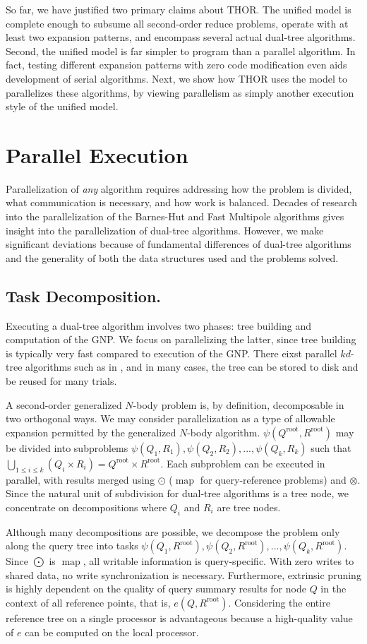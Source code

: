 \documentclass[twoside,leqno,twocolumn]{article}
\newcommand{\Union}{\bigcup}
\DeclareMathOperator*{\map}{map}
\newcommand{\gnp}{\psi}
\newcommand{\mysub}[1]{\subsection{#1.}}
\newcommand{\kdroot}[1]{#1^{\text{root}}}
\newcommand{\lettermu}{e}
\newcommand{\inmu}{e}
\begin{document}
So far, we have justified two primary claims about THOR.
The unified model is complete enough to subsume all second-order reduce problems, operate with at least two expansion patterns, and encompass several actual dual-tree algorithms.
Second, the unified model is far simpler to program than a parallel algorithm.
In fact, testing different expansion patterns with zero code modification even aids development of serial algorithms.
Next, we show how THOR uses the model to parallelizes these algorithms, by viewing parallelism as simply another execution style of the unified model.

\section{Parallel Execution}

Parallelization of {\em any} algorithm requires addressing how the problem is divided, what communication is necessary, and how work is balanced.
Decades of research into the parallelization of the Barnes-Hut and Fast Multipole algorithms gives insight into the parallelization of dual-tree algorithms.
However, we make significant deviations because of fundamental differences of dual-tree algorithms and the generality of both the data structures used and the problems solved.

\mysub{Task Decomposition}

Executing a dual-tree algorithm involves two phases: tree building and computation of the GNP.
We focus on parallelizing the latter, since tree building is typically very fast compared to execution of the GNP.
There eixst parallel $kd$-tree algorithms such as in \cite{alfuraih00parallel}, and in many cases, the tree can be stored to disk and be reused for many trials.

A second-order generalized $N$-body problem is, by definition, decomposable in two orthogonal ways.
We may consider parallelization as a type of allowable expansion permitted by the generalized $N$-body algorithm.
$\gnp(\kdroot{Q}, \kdroot{R})$ may be divided into subproblems $\gnp(Q_1,R_1), \gnp(Q_2,R_2), ..., \gnp(Q_k, R_k)$ such that $\Union_{1 \leq i \leq k} (Q_i \times R_i) = \kdroot{Q} \times \kdroot{R}$.
Each subproblem can be executed in parallel, with results merged using $\odot$ ($\map$ for query-reference problems) and $\otimes$.
Since the natural unit of subdivision for dual-tree algorithms is a tree node, we concentrate on decompositions where $Q_i$ and $R_i$ are tree nodes.

Although many decompositions are possible, we decompose the problem only along the query tree into tasks $\gnp(Q_1, \kdroot{R}), \gnp(Q_2, \kdroot{R}), ..., \gnp(Q_k, \kdroot{R})$.
Since $\bigodot$ is $\map$, all writable information is query-specific.
With zero writes to shared data, no write synchronization is necessary.
Furthermore, extrinsic pruning is highly dependent on the quality of query summary results for node $Q$ in the context of all reference points, that is, $\inmu(Q, \kdroot{R})$.
Considering the entire reference tree on a single processor is advantageous because a high-quality value of $\lettermu$ can be computed on the local processor.
\end{document}
